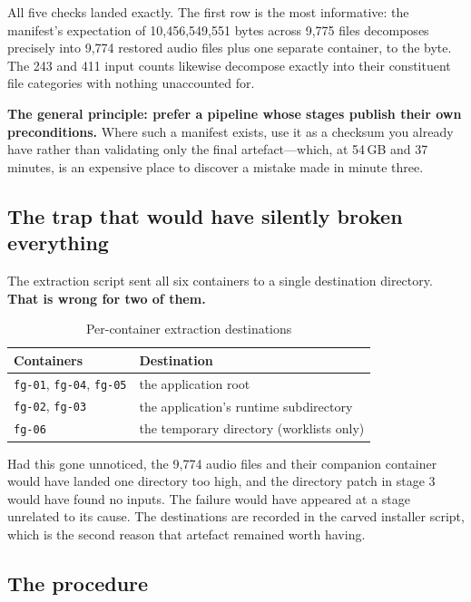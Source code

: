 All five checks landed exactly. The first row is the most informative: the
manifest's expectation of 10{,}456{,}549{,}551 bytes across 9{,}775 files
decomposes precisely into 9{,}774 restored audio files plus one separate
container, to the byte. The 243 and 411 input counts likewise decompose exactly
into their constituent file categories with nothing unaccounted for.

\textbf{The general principle: prefer a pipeline whose stages publish their own
preconditions.} Where such a manifest exists, use it as a checksum you already
have rather than validating only the final artefact---which, at 54\,GB and 37
minutes, is an expensive place to discover a mistake made in minute three.

\subsection{The trap that would have silently broken everything}

The extraction script sent all six containers to a single destination directory.
\textbf{That is wrong for two of them.}

\begin{table}[htbp]
\caption{Per-container extraction destinations}
\label{tab:dest}
\centering
\footnotesize
\begin{tabular}{@{}ll@{}}
\toprule
\textbf{Containers} & \textbf{Destination} \\
\midrule
\verb|fg-01|, \verb|fg-04|, \verb|fg-05| & the application root \\
\verb|fg-02|, \verb|fg-03| & the application's runtime subdirectory \\
\verb|fg-06| & the temporary directory (worklists only) \\
\bottomrule
\end{tabular}
\end{table}

Had this gone unnoticed, the 9{,}774 audio files and their companion container
would have landed one directory too high, and the directory patch in stage 3
would have found no inputs. The failure would have appeared at a stage unrelated
to its cause. The destinations are recorded in the carved installer script, which
is the second reason that artefact remained worth having.

\subsection{The procedure}

